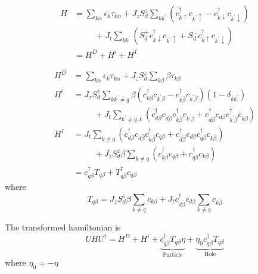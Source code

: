 \documentclass[14pt]{extarticle}
\numberwithin{equation}{section}
\begin{document}
\begin{align}
 H &= \sum\limits_{k \alpha} \epsilon_k \tau_{k\alpha} + J_z S_d^z \sum\limits_{kk^{\prime}} \left( c^{\dag}_{k\uparrow}c_{k^{\prime}\uparrow} - c^{\dag}_{k\downarrow}c_{k^{\prime}\downarrow} \right) \nonumber\\
& \hspace{30pt} + J_t \sum\limits_{kk^{\prime}} \left( S_d^+ c^{\dag}_{k\downarrow}c_{k^{\prime}\uparrow} + S_d^- c^{\dag}_{k\uparrow}c_{k^{\prime}\downarrow} \right) \label{eq:a32} \\
&= H^D + H^i + H^I \nonumber
\end{align}

\begin{align}
  H^D &= \sum\limits_{k \alpha} \epsilon_k \tau_{k\alpha}  +J_z S_d^z \sum\limits_{k\beta} \beta \tau_{k\beta} \label{eq:a33} \\
  H^i &= J_z S_d^z \sum\limits_{kk^{\prime} \ne q} \beta \left( c^{\dag}_{k\beta} c_{k^{\prime}\beta} - c^{\dag}_{k\bar{\beta}} c_{k^{\prime}\bar{\beta}} \right) \left( 1 - \delta_{kk^{\prime}} \right) \nonumber\\
& \hspace{30pt} + J_t \sum\limits_{k^{\prime}\ne q, k} \left( c^{\dag}_{d\beta} c_{d\bar{\beta}} c^{\dag}_{k\bar{\beta}} c_{k^{\prime} \beta} + c^{\dag}_{d\bar{\beta}} c_{d\beta} c^{\dag}_{k^{\prime} \beta} c_{k\bar{\beta}}  \right)\label{eq:a34} \\
  H^I &= J_t \sum\limits_{k \ne q} \left( c^{\dag}_{d\beta} c_{d\bar{\beta}} c^{\dag}_{k\bar{\beta}} c_{q\beta} + c^{\dag}_{d\bar{\beta}} c_{d\beta} c^{\dag}_{q\beta} c_{k\bar{\beta}}  \right) \nonumber\\
&\hspace{30pt} + J_zS_d^z\beta \sum\limits_{k \ne q} \left( c^{\dag}_{k\beta} c_{q\beta} + c_{q\beta}^{\dag} c_{k\beta} \right)  \label{eq:a35} \\
  &= c^{\dag}_{q\beta}T_{q\beta} + T_{q\beta}^{\dag}c_{q\beta} \nonumber
\end{align}
where
\begin{equation}
T_{q\beta} =  J_zS_d^z \beta \sum\limits_{k \neq q} c_{k\beta} + J_t c^{\dag}_{d\bar{\beta}} c_{d\beta} \sum\limits_{k \neq q} c_{k\bar{\beta}} \label{eq:a36} 
\end{equation}

The transformed hamiltonian is
\begin{equation}
 UHU^{\dag} = H^D + H^i + \underbrace{c^{\dag}_{q\beta}T_{q\beta}\eta}_{\text{Particle}} + \underbrace{\eta_0 c^{\dag}_{q\beta}T_{q\beta}}_{\text{Hole}}  \label{eq:1} 
\end{equation}
where $\eta_0 = -\eta$ 
\end{document}
